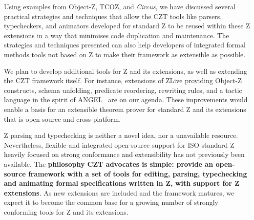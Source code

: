 \documentclass{llncs}
\newcommand{\Circus}{{\sf\slshape Circus}}
\begin{document}
  Using examples from Object-Z, TCOZ, and \Circus, we have discussed
  several practical strategies and techniques that allow the CZT tools
  like parsers, typecheckers, and animators developed for standard Z
  to be reused within these Z extensions in a way that minimises code
  duplication and maintenance.  The strategies and techniques
  presented can also help developers of integrated formal methods
  tools not based on Z to make their framework as extensible as
  possible.

  We plan to develop additional tools for Z and its extensions,
  as well as extending the CZT framework itself.
  For instance, extensions of ZLive providing Object-Z constructs,
  schema unfolding, predicate reordering, rewriting rules, and
  a tactic language in the spirit of ANGEL~\cite{z.others:angel} are
  on our agenda. These improvements would enable a basis for an extensible
  theorem prover for standard Z and its extensions that is open-source and
  cross-platform.

  Z parsing and typechecking is neither a novel idea, nor a
  unavailable resource.  Nevertheless, flexible and integrated
  open-source support for ISO standard Z heavily focused
  on strong conformance and extensibility has not previously been available.
  The \textbf{philosophy CZT advocates is simple: provide an
  open-source framework with a set of tools for editing, parsing,
  typechecking and animating formal specifications written in Z, with
  support for Z extensions}.  As new extensions are included and the
  framework matures, we expect it to become the common base for a
  growing number of strongly conforming tools for Z and its extensions.



\end{document}
